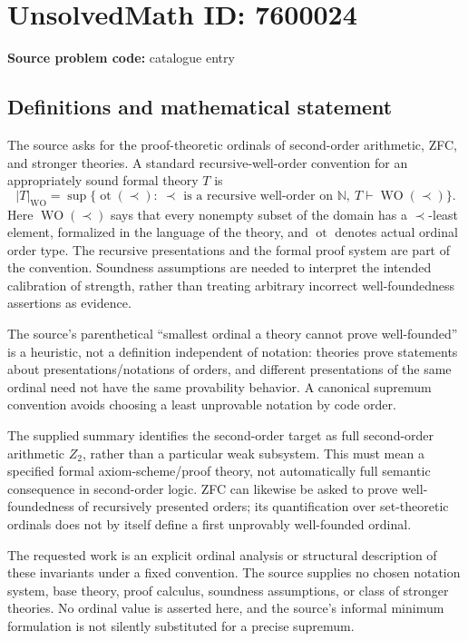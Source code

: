\documentclass[11pt]{article}
\newcommand{\N}{\mathbb{N}}
\begin{document}
\section*{UnsolvedMath ID: 7600024}
\textbf{Source problem code:} catalogue entry
\subsection{Definitions and mathematical statement}
The source asks for the proof-theoretic ordinals of second-order arithmetic, ZFC, and stronger theories. A standard recursive-well-order convention for an appropriately sound formal theory $T$ is
\[
|T|_{\mathrm{WO}}=\sup\{\operatorname{ot}(\prec):\ \prec\text{ is a recursive well-order on }\N,
\ T\vdash\operatorname{WO}(\prec)\}.
\]
Here $\operatorname{WO}(\prec)$ says that every nonempty subset of the domain has a $\prec$-least element, formalized in the language of the theory, and $\operatorname{ot}$ denotes actual ordinal order type. The recursive presentations and the formal proof system are part of the convention. Soundness assumptions are needed to interpret the intended calibration of strength, rather than treating arbitrary incorrect well-foundedness assertions as evidence.

The source's parenthetical ``smallest ordinal a theory cannot prove well-founded'' is a heuristic, not a definition independent of notation: theories prove statements about presentations/notations of orders, and different presentations of the same ordinal need not have the same provability behavior. A canonical supremum convention avoids choosing a least unprovable notation by code order.

The supplied summary identifies the second-order target as full second-order arithmetic $Z_2$, rather than a particular weak subsystem. This must mean a specified formal axiom-scheme/proof theory, not automatically full semantic consequence in second-order logic. ZFC can likewise be asked to prove well-foundedness of recursively presented orders; its quantification over set-theoretic ordinals does not by itself define a first unprovably well-founded ordinal.

The requested work is an explicit ordinal analysis or structural description of these invariants under a fixed convention. The source supplies no chosen notation system, base theory, proof calculus, soundness assumptions, or class of stronger theories. No ordinal value is asserted here, and the source's informal minimum formulation is not silently substituted for a precise supremum.
\end{document}
